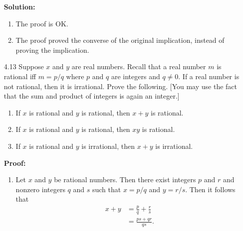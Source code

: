 \begin{enumerate}
		\textbf{Solution:}
		
		\begin{enumerate}
			\item	The proof is OK.
			\item	The proof proved the converse of the original implication,
					instead of proving the implication.
      \end{enumerate} 
   \item[4.13] Suppose $x$ and $y$ are real numbers. Recall that a real number
               $m$ is rational iff $m = p/q$ where $p$ and $q$ are integers and
               $q \neq 0$. If a real number is not rational, then it is
               irrational. Prove the following. [You may use the fact that the
               sum and product of integers is again an integer.]
               \begin{enumerate}
                  \item If $x$ is rational and $y$ is rational, then $x + y$ is
                        rational.
                  \item If $x$ is rational and $y$ is rational, then $xy$ is 
                        rational.
                  \item If $x$ is rational and $y$ is irrational, then $x + y$
                        is irrational.
               \end{enumerate}
					
		\textbf{Proof:}
		
		\begin{enumerate}
			\item	Let $x$ and $y$ be rational numbers. Then there exist integers
					$p$ and $r$ and nonzero integers $q$ and $s$ such that $x = p/q$
					and $y = r/s$. Then it follows that
					\begin{align*}
						x + y &= \frac{p}{q} + \frac{r}{s} \\
								&= \frac{ps + qr}{qs}.
					\end{align*}
					

\end{enumerate}
\end{enumerate}
